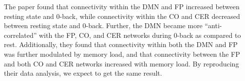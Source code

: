 \documentclass[11pt]{article}
\begin{document}
The paper found that connectivity within the DMN and FP increased between resting state and 0-back, while connectivity within the CO and CER decreased between resting state and 0-back. Further, the DMN became more “anti-correlated” with the FP, CO, and CER networks during 0-back as compared to rest. Additionally, they found that connectivity within both the DMN and FP was further modulated by memory load, and that connectivity between the FP and both CO and CER networks increased with memory load. By reproducing their data analysis, we expect to get the same result.


\end{document}
